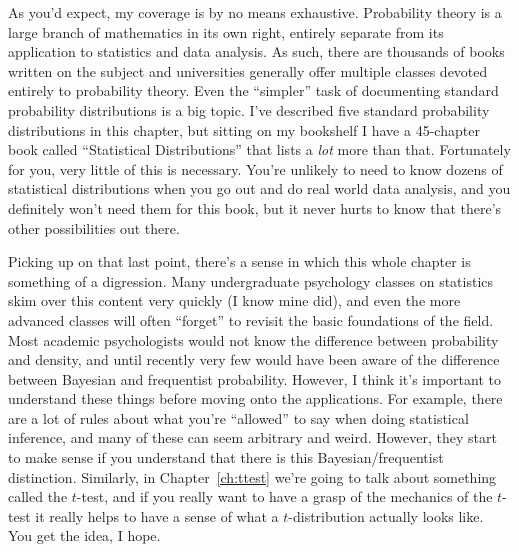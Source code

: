As you'd expect, my coverage is by no means exhaustive. Probability theory is a large branch of mathematics in its own right, entirely separate from its application to statistics and data analysis. As such, there are thousands of books written on the subject and universities generally offer multiple classes devoted entirely to probability theory. Even the ``simpler'' task of documenting standard probability distributions is a big topic. I've described five standard probability distributions in this chapter, but sitting on my bookshelf I have a 45-chapter book called ``Statistical Distributions'' \cite{Evans2000} that lists a {\it lot} more than that. Fortunately for you, very little of this is necessary. You're unlikely to need to know dozens of statistical distributions when you go out and do real world data analysis, and you definitely won't need them for this book, but it never hurts to know that there's other possibilities out there.

Picking up on that last point, there's a sense in which this whole chapter is something of a digression. Many undergraduate psychology classes on statistics skim over this content very quickly (I know mine did), and even the more advanced classes will often ``forget'' to revisit the basic foundations of the field. Most academic psychologists would not know the difference between probability and density, and until recently very few would have been aware of the difference between Bayesian and frequentist probability. However, I think it's important to understand these things before moving onto the applications. For example, there are a lot of rules about what you're ``allowed'' to say when doing statistical inference, and many of these can seem arbitrary and weird. However, they start to make sense if you understand that there is this Bayesian/frequentist distinction. Similarly, in Chapter~\ref{ch:ttest} we're going to talk about something called the $t$-test, and if you really want to have a grasp of the mechanics of the $t$-test it really helps to have a sense of what a $t$-distribution actually looks like. You get the idea, I hope.






